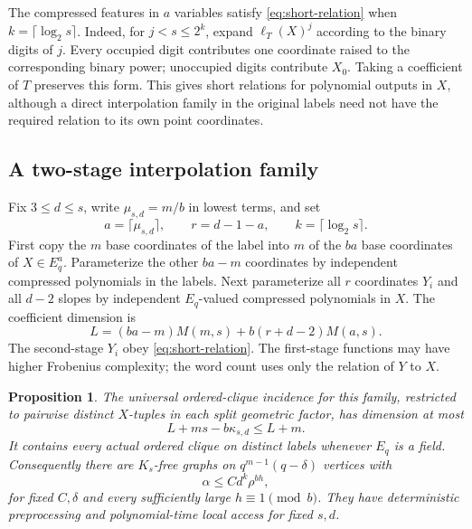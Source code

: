 \documentclass[11pt,a4paper]{article}
\newtheorem{proposition}[theorem]{Proposition}
\theoremstyle{definition}
\theoremstyle{remark}
\numberwithin{equation}{section}
\begin{document}
The compressed features in $a$ variables satisfy \eqref{eq:short-relation} when $k=\lceil\log_2s\rceil$. Indeed, for $j<s\le2^k$, expand $\ell_T(X)^j$ according to the binary digits of $j$. Every occupied digit contributes one coordinate raised to the corresponding binary power; unoccupied digits contribute $X_0$. Taking a coefficient of $T$ preserves this form. This gives short relations for polynomial outputs in $X$, although a direct interpolation family in the original labels need not have the required relation to its own point coordinates.

\subsection{A two-stage interpolation family}\label{sec:two-stage}
Fix $3\le d\le s$, write $\mu_{s,d}=m/b$ in lowest terms, and set
\begin{equation}\label{eq:two-stage-parameters}
a=\lceil\mu_{s,d}\rceil,\qquad r=d-1-a,\qquad k=\lceil\log_2s\rceil.
\end{equation}
First copy the $m$ base coordinates of the label into $m$ of the $ba$ base coordinates of $X\in E_q^a$. Parameterize the other $ba-m$ coordinates by independent compressed polynomials in the labels. Next parameterize all $r$ coordinates $Y_i$ and all $d-2$ slopes by independent $E_q$-valued compressed polynomials in $X$. The coefficient dimension is
\begin{equation}\label{eq:two-stage-L}
L=(ba-m)M(m,s)+b(r+d-2)M(a,s).
\end{equation}
The second-stage $Y_i$ obey \eqref{eq:short-relation}. The first-stage functions may have higher Frobenius complexity; the word count uses only the relation of $Y$ to $X$.

\begin{proposition}\label{prop:two-stage}
The universal ordered-clique incidence for this family, restricted to pairwise distinct $X$-tuples in each split geometric factor, has dimension at most
\[
L+ms-b\kappa_{s,d}\le L+m.
\]
It contains every actual ordered clique on distinct labels whenever $E_q$ is a field. Consequently there are $K_s$-free graphs on $q^{m-1}(q-\delta)$ vertices with
\[
\alpha\le C d^k\rho^{bh},
\]
for fixed $C,\delta$ and every sufficiently large $h\equiv1\pmod b$. They have deterministic preprocessing and polynomial-time local access for fixed $s,d$.
\end{proposition}
\end{document}

